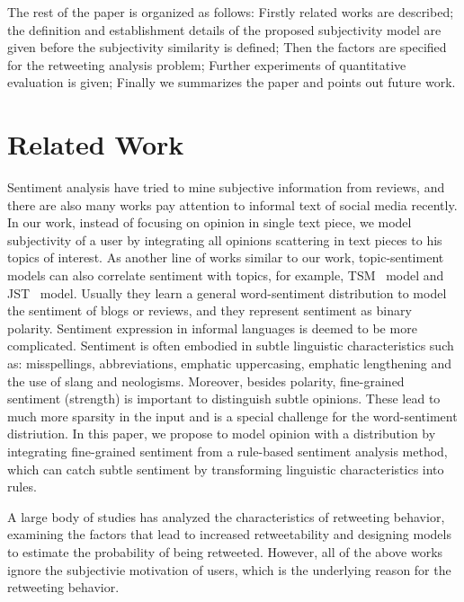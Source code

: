 \documentclass[letterpaper]{article}
\begin{document}
The rest of the paper is organized as follows: Firstly related works are described; the definition and establishment details of the proposed subjectivity model are given before the subjectivity similarity is defined; Then the factors are specified for the retweeting analysis problem; Further experiments of quantitative evaluation is given; Finally we summarizes the paper and points out future work.

\section{Related Work}
\label{relatedwork}

Sentiment analysis have tried to mine subjective information from reviews\cite{liu2012sentiment}, and there are also many works pay attention to informal text of social media recently\cite{jiang2011target,tan2011user,Guerra2014}. In our work, instead of focusing on opinion in single text piece, we model subjectivity of a user by integrating all opinions scattering in text pieces to his topics of interest. As another line of works similar to our work, topic-sentiment models can also correlate sentiment with topics, for example, TSM~\cite{mei2007topic} model and JST~\cite{lin2009joint} model. Usually they learn a general word-sentiment distribution to model the sentiment of blogs or reviews, and they represent sentiment as binary polarity. Sentiment expression in informal languages is deemed to be more complicated. Sentiment is often embodied in subtle linguistic characteristics such as: misspellings, abbreviations, emphatic uppercasing, emphatic lengthening and the use of slang and neologisms. Moreover, besides polarity,  fine-grained sentiment (strength) is important to distinguish subtle opinions. These lead to much more sparsity in the input and is a special challenge for the word-sentiment distriution. In this paper, we propose to model opinion with a distribution by integrating fine-grained sentiment from a rule-based sentiment analysis method, which can catch subtle sentiment by transforming linguistic characteristics into rules\cite{thelwall2010sentiment}.
   
A large body of studies has analyzed the characteristics of retweeting behavior\cite{Bian2014,Luo:2013RMF}, examining the factors that lead to increased retweetability\cite{suh2010want,comarela2012understanding} and designing models to estimate the probability of being retweeted\cite{jenders2013analyzing,pfitzner2012emotional}. However, all of the above works ignore the subjectivie motivation of users, which is the underlying reason for the retweeting behavior. 
\end{document}
